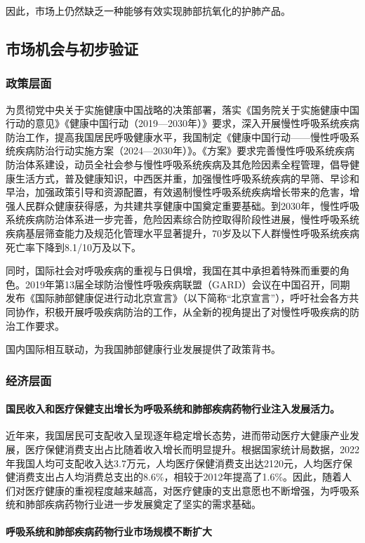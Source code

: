 \documentclass[12pt]{ctexart}
\begin{document}
因此，市场上仍然缺乏一种能够有效实现肺部抗氧化的护肺产品。

\subsection{市场机会与初步验证}
\subsubsection{政策层面}
为贯彻党中央关于实施健康中国战略的决策部署，落实《国务院关于实施健康中国行动的意见》《健康中国行动（2019—2030年）》要求，深入开展慢性呼吸系统疾病防治工作，提高我国居民呼吸健康水平，我国制定《健康中国行动——慢性呼吸系统疾病防治行动实施方案（2024—2030年）》。《方案》要求完善慢性呼吸系统疾病防治体系建设，动员全社会参与慢性呼吸系统疾病及其危险因素全程管理，倡导健康生活方式，普及健康知识，中西医并重，加强慢性呼吸系统疾病的早筛、早诊和早治，加强政策引导和资源配置，有效遏制慢性呼吸系统疾病增长带来的危害，增强人民群众健康获得感，为共建共享健康中国奠定重要基础。到2030年，慢性呼吸系统疾病防治体系进一步完善，危险因素综合防控取得阶段性进展，慢性呼吸系统疾病基层筛查能力及规范化管理水平显著提升，70岁及以下人群慢性呼吸系统疾病死亡率下降到8.1/10万及以下。

同时，国际社会对呼吸疾病的重视与日俱增，我国在其中承担着特殊而重要的角色。2019年第13届全球防治慢性呼吸疾病联盟（GARD）会议在中国召开，同期发布《国际肺部健康促进行动北京宣言》（以下简称“北京宣言”），呼吁社会各方共同协作，积极开展呼吸疾病防治的工作，从全新的视角提出了对慢性呼吸疾病的防治工作要求。

国内国际相互联动，为我国肺部健康行业发展提供了政策背书。
\subsubsection{经济层面}
\paragraph{国民收入和医疗保健支出增长为呼吸系统和肺部疾病药物行业注入发展活力。}

近年来，我国居民可支配收入呈现逐年稳定增长态势，进而带动医疗大健康产业发展，医疗保健消费支出占比随着收入增长而明显提升。根据国家统计局数据，2022年我国人均可支配收入达3.7万元，人均医疗保健消费支出达2120元，人均医疗保健消费支出占人均消费总支出的8.6\%，相较于2012年提高了1.6\%。因此，随着人们对医疗健康的重视程度越来越高，对医疗健康的支出意愿也不断增强，为呼吸系统和肺部疾病药物行业进一步发展奠定了坚实的需求基础。

\paragraph{呼吸系统和肺部疾病药物行业市场规模不断扩大}
\end{document}
